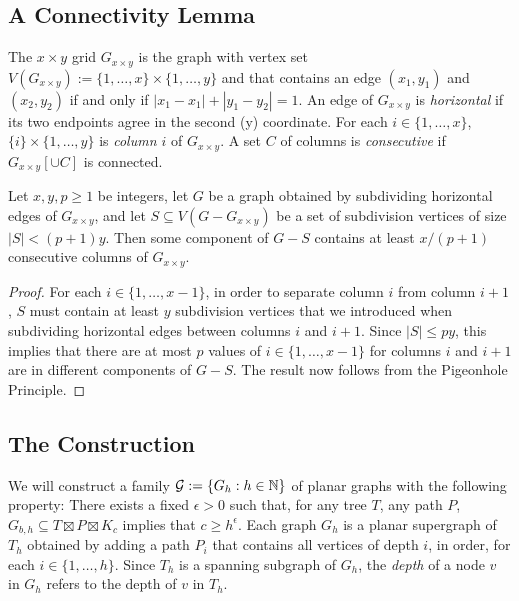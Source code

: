 \documentclass{patmorin}
\newcommand{\defin}[1]{\emph{\color{brightmaroon}#1}}
\begin{document}
\subsection{A Connectivity Lemma}

The $x\times y$ grid $G_{x\times y}$ is the graph with vertex set $V(G_{x\times y}):=\{1,\ldots,x\}\times\{1,\ldots,y\}$ and that contains an edge $(x_1,y_1)$ and $(x_2,y_2)$ if and only if $|x_1-x_1|+|y_1-y_2|=1$.  An edge of $G_{x\times y}$ is \defin{horizontal} if its two endpoints agree in the second (y) coordinate.  For each $i\in\{1,\ldots,x\}$, $\{i\}\times\{1,\ldots,y\}$ is \defin{column $i$} of $G_{x\times y}$.  A set $C$ of columns is \defin{consecutive} if $G_{x\times y}[\cup C]$ is connected. 


\begin{lem}\label{grid_connectivity}
  Let $x,y,p\ge 1$ be integers, let $G$ be a graph obtained by subdividing horizontal edges of $G_{x\times y}$, and let $S\subseteq V(G-G_{x\times y})$ be a set of subdivision vertices of size $|S|< (p+1)y$.  Then some component of $G-S$ contains at least $x/(p+1)$ consecutive columns of $G_{x\times y}$.
\end{lem}

\begin{proof}
  For each $i\in\{1,\ldots,x-1\}$, in order to separate column $i$ from column $i+1$, $S$ must contain at least $y$ subdivision vertices that we introduced when subdividing horizontal edges between columns $i$ and $i+1$.  Since $|S|\le py$, this implies that there are at most $p$ values of $i\in\{1,\ldots,x-1\}$ for columns $i$ and $i+1$ are in different components of $G-S$. The result now follows from the Pigeonhole Principle.
\end{proof}

\subsection{The Construction}


We will construct a family $\mathcal{G}:=\{G_{h}:h\in\mathbb{N}\}$ of planar graphs with the following property:  There exists a fixed $\epsilon >0$ such that, for any tree $T$, any path $P$, $G_{b,h}\subseteq T\boxtimes P\boxtimes K_c$ implies that $c\ge h^\epsilon$.  Each graph $G_{h}$ is a planar supergraph of $T_h$ obtained by adding a path $P_i$ that contains all vertices of depth $i$, in order, for each $i\in\{1,\ldots,h\}$.   Since $T_h$ is a spanning subgraph of $G_h$, the \defin{depth} of a node $v$ in $G_h$ refers to the depth of $v$ in $T_h$.  
\end{document}
